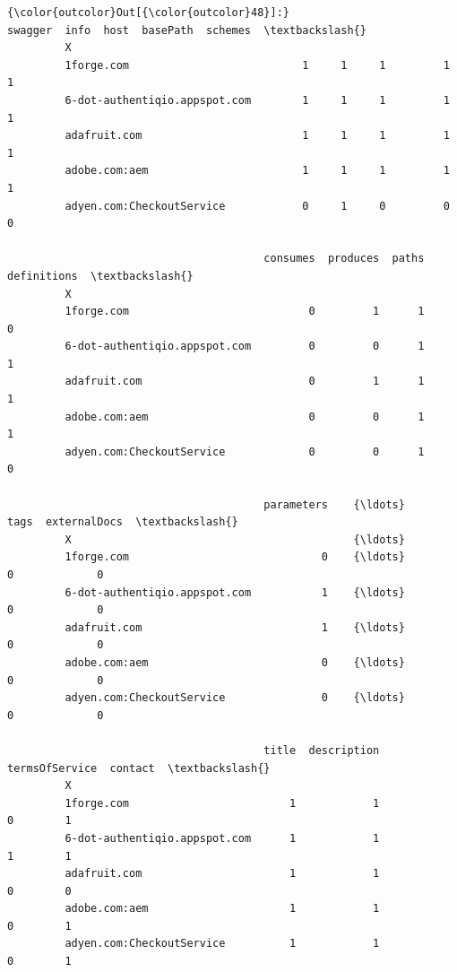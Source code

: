 \documentclass[11pt]{article}
\begin{document}
\begin{Verbatim}[commandchars=\\\{\}]
{\color{outcolor}Out[{\color{outcolor}48}]:}                                swagger  info  host  basePath  schemes  \textbackslash{}
         X                                                                       
         1forge.com                           1     1     1         1        1   
         6-dot-authentiqio.appspot.com        1     1     1         1        1   
         adafruit.com                         1     1     1         1        1   
         adobe.com:aem                        1     1     1         1        1   
         adyen.com:CheckoutService            0     1     0         0        0   
         
                                        consumes  produces  paths  definitions  \textbackslash{}
         X                                                                       
         1forge.com                            0         1      1            0   
         6-dot-authentiqio.appspot.com         0         0      1            1   
         adafruit.com                          0         1      1            1   
         adobe.com:aem                         0         0      1            1   
         adyen.com:CheckoutService             0         0      1            0   
         
                                        parameters    {\ldots}     tags  externalDocs  \textbackslash{}
         X                                            {\ldots}                          
         1forge.com                              0    {\ldots}        0             0   
         6-dot-authentiqio.appspot.com           1    {\ldots}        0             0   
         adafruit.com                            1    {\ldots}        0             0   
         adobe.com:aem                           0    {\ldots}        0             0   
         adyen.com:CheckoutService               0    {\ldots}        0             0   
         
                                        title  description  termsOfService  contact  \textbackslash{}
         X                                                                            
         1forge.com                         1            1               0        1   
         6-dot-authentiqio.appspot.com      1            1               1        1   
         adafruit.com                       1            1               0        0   
         adobe.com:aem                      1            1               0        1   
         adyen.com:CheckoutService          1            1               0        1   
         

\end{Verbatim}
\end{document}
